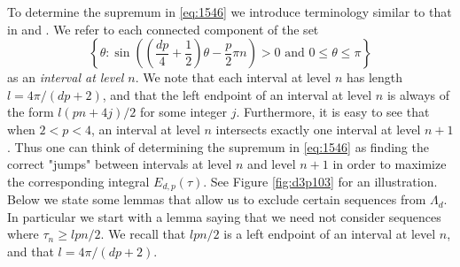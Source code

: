 \documentclass{amsart}
\theoremstyle{plain}
\theoremstyle{remark}
\begin{document}
	To determine the supremum in \eqref{eq:1546} we introduce terminology similar to that in \cite{Brevig} and \cite{Instanes}. We refer to each connected component of the set
	\[\left\{\theta: \sin \left(\left(\frac{dp}{4}+\frac{1}{2}\right) \theta - \frac{p}{2} \pi n \right)>0 \text{ and } 0 \leq \theta \leq \pi \right\}\]
	as an \emph{interval at level $n$}. We note that each interval at level $n$ has length $l= 4\pi/(dp+2)$, and that the left endpoint of an interval at level $n$ is always of the form $l(pn+4j)/2$ for some integer $j$. Furthermore, it is easy to see that when $2<p<4$, an interval at level $n$ intersects exactly one interval at level $n+1$. Thus one can think of determining the supremum in \eqref{eq:1546} as finding the correct "jumps" between intervals at level $n$ and level $n+1$ in order to maximize the corresponding integral $E_{d,p}(\tau)$. See Figure \ref{fig:d3p103} for an illustration. Below we state some lemmas that allow us to exclude certain sequences from $\Lambda_d$. In particular we start with a lemma saying that we need not consider sequences where $\tau_n \geq lpn/2$. We recall that $lpn/2$ is a left endpoint of an interval at level $n$, and that $l=4\pi/(dp+2)$.
\end{document}
